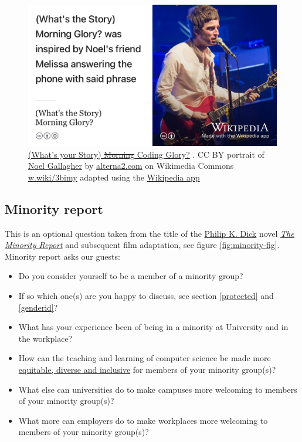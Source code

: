 \documentclass[
]{book}
\providecommand{\tightlist}{%
  \setlength{\itemsep}{0pt}\setlength{\parskip}{0pt}}
\begin{document}
\begin{figure}

{\centering \includegraphics[width=1\linewidth]{images/whats-the-story} 

}

\caption{\href{https://en.wikipedia.org/wiki/(What\%27s_the_Story)_Morning_Glory\%3F}{(What's your Story) \sout{Morning} Coding Glory?} \citep{whatsthestory}. CC BY portrait of \href{https://en.wikipedia.org/wiki/Noel_Gallagher}{Noel Gallagher} by \href{https://alterna2.com/}{alterna2.com} on Wikimedia Commons \href{https://w.wiki/3bim}{w.wiki/3bimy} adapted using the \href{https://apps.apple.com/us/app/wikipedia/id324715238}{Wikipedia app}}\label{fig:gallagher2-fig}
\end{figure}



\hypertarget{minority}{%
\subsection{Minority report}\label{minority}}

This is an optional question taken from the title of the \href{https://en.wikipedia.org/wiki/Philip_K._Dick}{Philip K. Dick} novel \emph{\href{https://en.wikipedia.org/wiki/The_Minority_Report}{The Minority Report}} and subsequent film adaptation, see figure \ref{fig:minority-fig}. Minority report asks our guests:

\begin{itemize}
\tightlist
\item
  Do you consider yourself to be a member of a minority group?
\item
  If so which one(s) are you happy to discuss, see section \ref{protected} and \ref{genderid}?
\item
  What has your experience been of being in a minority at University and in the workplace?
\item
  How can the teaching and learning of computer science be made more \href{https://en.wikipedia.org/wiki/Diversity,_equity,_and_inclusion}{equitable, diverse and inclusive} for members of your minority group(s)?
\item
  What else can universities do to make campuses more welcoming to members of your minority group(s)?
\item
  What more can employers do to make workplaces more welcoming to members of your minority group(s)?
\end{itemize}
\end{document}
